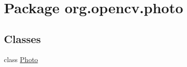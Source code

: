 \hypertarget{namespaceorg_1_1opencv_1_1photo}{}\section{Package org.\+opencv.\+photo}
\label{namespaceorg_1_1opencv_1_1photo}
\subsection*{Classes}
\begin{DoxyCompactItemize}
\item 
class \mbox{\hyperlink{classorg_1_1opencv_1_1photo_1_1_photo}{Photo}}
\end{DoxyCompactItemize}
